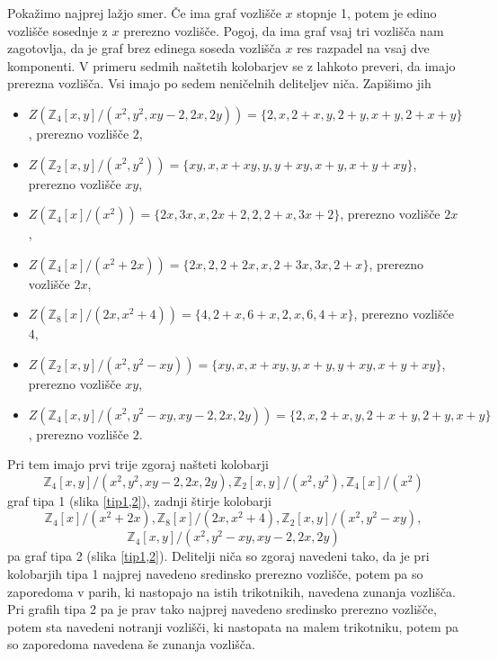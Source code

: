 \documentclass[a4paper, 12pt]{amsart}
\theoremstyle{definition} %
\theoremstyle{plain} %
\newcommand{\Z}{\mathbb Z}
\begin{document}
\proof
Pokažimo najprej lažjo smer. Če ima graf vozlišče $x$ stopnje 1, potem je edino vozlišče sosednje z $x$ prerezno vozlišče. Pogoj, da ima graf vsaj tri vozlišča nam zagotovlja, da je graf brez edinega soseda vozlišča $x$ res razpadel na vsaj dve komponenti. 
V primeru sedmih naštetih kolobarjev se z lahkoto preveri, da imajo prerezna vozlišča. Vsi imajo po sedem neničelnih deliteljev niča. Zapišimo jih
\begin{itemize}
\item $Z(\Z_4[x,y]/(x^2,y^2,xy-2,2x,2y)) = \{2,x,2+x,y,2+y,x+y,2+x+y\}$, prerezno vozlišče $2$,
\item $Z(\Z_2[x,y]/(x^2,y^2)) = \{xy,x,x+xy,y,y+xy,x+y,x+y+xy\}$, prerezno vozlišče $xy$,
\item $Z(\Z_4[x]/(x^2)) = \{2x,3x,x,2x+2,2,2+x,3x+2\}$, prerezno vozlišče $2x$,
\item $Z(\Z_4[x]/(x^2+2x)) = \{2x,2,2+2x,x,2+3x,3x,2+x\}$, prerezno vozlišče $2x$,
\item $Z(\Z_8[x]/(2x,x^2+4)) = \{4,2+x,6+x,2,x,6,4+x\}$, prerezno vozlišče $4$,
\item $Z(\Z_2[x,y]/(x^2,y^2-xy)) = \{xy,x,x+xy,y,x+y,y+xy,x+y+xy\}$, prerezno vozlišče $xy$,
\item $Z(\Z_4[x,y]/(x^2,y^2-xy,xy-2,2x,2y)) = \{2,x,2+x,y,2+x+y,2+y,x+y\}$, prerezno vozlišče $2$.
\end{itemize} 
Pri tem imajo prvi trije zgoraj našteti kolobarji 
$$
\Z_4[x,y]/(x^2,y^2,xy-2,2x,2y), \Z_2[x,y]/(x^2,y^2), \Z_4[x]/(x^2)
$$
graf tipa 1 (slika \ref{tip1,2}), zadnji štirje kolobarji 
$$
\Z_4[x]/(x^2+2x), \Z_8[x]/(2x,x^2 + 4), \Z_2[x,y]/(x^2, y^2 - xy),
$$
$$
\Z_4[x,y]/(x^2, y^2 - xy, xy-2,2x,2y)
$$
pa graf  tipa 2 (slika \ref{tip1,2}). Delitelji niča so zgoraj navedeni tako, da je pri kolobarjih tipa 1 najprej navedeno sredinsko prerezno vozlišče, potem pa so zaporedoma v parih, ki nastopajo na istih trikotnikih, navedena zunanja vozlišča. Pri grafih tipa 2 pa je prav tako najprej navedeno sredinsko prerezno vozlišče, potem sta navedeni notranji vozlišči, ki nastopata na malem trikotniku, potem pa so zaporedoma navedena še zunanja vozlišča.
\end{document}

